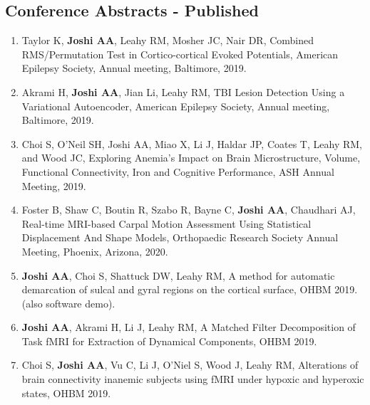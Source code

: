 \documentclass[overlapped,line,letterpaper]{res}
\begin{document}
\begin{resume}

\subsection{Conference Abstracts - Published}
\begin{enumerate}

    \item Taylor K, \textbf{Joshi AA}, Leahy RM, Mosher JC, Nair DR, Combined RMS/Permutation Test in Cortico-cortical Evoked Potentials, American Epilepsy Society, Annual meeting, Baltimore, 2019.

    \item Akrami H, \textbf{Joshi AA}, Jian Li, Leahy RM, {TBI Lesion Detection Using a Variational Autoencoder}, American Epilepsy Society, Annual meeting, Baltimore, 2019.

    \item Choi S, O'Neil SH, Joshi AA, Miao X, Li J, Haldar JP, Coates T, Leahy RM, and Wood JC, {Exploring Anemia’s Impact on Brain Microstructure, Volume, Functional Connectivity, Iron and Cognitive Performance}, ASH Annual Meeting, 2019.

    \item Foster B, Shaw C, Boutin R, Szabo R, Bayne C, \textbf{Joshi AA}, Chaudhari AJ, {Real-time MRI-based Carpal Motion Assessment Using Statistical Displacement And Shape Models}, Orthopaedic Research Society Annual Meeting, Phoenix, Arizona, 2020.

    \item \textbf{Joshi AA}, Choi S, Shattuck DW, Leahy RM, {A method for automatic demarcation of sulcal and gyral regions on the cortical surface}, OHBM 2019. (also software demo).

    \item \textbf{Joshi AA}, Akrami H, Li J, Leahy RM, {A Matched Filter Decomposition of Task fMRI for Extraction of Dynamical Components}, OHBM 2019.

    \item Choi S, \textbf{Joshi AA}, Vu C, Li J, O'Niel S, Wood J, Leahy RM, {Alterations of brain connectivity inanemic subjects using fMRI under hypoxic and hyperoxic states}, OHBM 2019.


\end{enumerate}
\end{resume}
\end{document}
